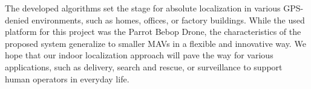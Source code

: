 The developed algorithms set the stage for absolute localization in various
GPS-denied environments, such as homes, offices, or factory buildings. While the used platform for this project was the Parrot Bebop Drone, the characteristics of the proposed system generalize to smaller MAVs in a flexible and innovative way.
We hope that our indoor localization approach will
pave the way for various applications, such as delivery, search and
rescue, or surveillance to support human operators in everyday
life.